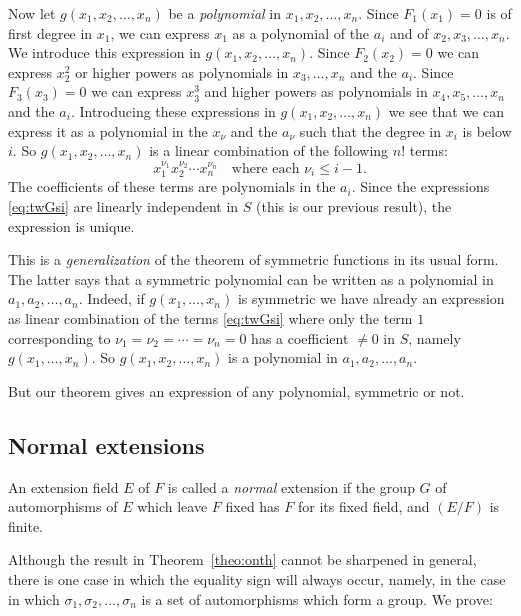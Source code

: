 \documentclass[10pt,leqno]{article}
\theoremstyle{definition}
\begin{document}
Now let $g(x_1, x_2, \ldots, x_n)$ be a \emph{polynomial} in $x_1, x_2, \ldots, x_n$.
Since $F_1(x_1) = 0$ is of first degree in $x_1$, we can express $x_1$ as a polynomial of the $a_i$ and of $x_2, x_3, \ldots, x_n$.
We introduce this expression in $g(x_1,x_2,\ldots,x_n)$.
Since $F_2(x_2) = 0$ we can express $x_2^2$ or higher powers as polynomials in $x_3, \ldots, x_n$ and the $a_i$.
Since $F_3(x_3) = 0$ we can express $x_3^3$ and higher powers as polynomials in $x_4, x_5, \ldots, x_n$ and the $a_i$.
Introducing these expressions in $g(x_1, x_2, \ldots, x_n)$ we see that we can express it as a polynomial in the $x_\nu$ and the $a_\nu$ such that the degree in $x_i$ is below $i$.
So $g(x_1, x_2, \ldots, x_n)$ is a linear combination of the following $n!$ terms:
\begin{equation}
\label{eq:twGsi}
x_1^{\nu_1} x_2^{\nu_2} \cdots x_n^{\nu_n}
\quad
\text{where each $\nu_i \leq i-1$.}
\end{equation}
The coefficients of these terms are polynomials in the $a_i$.
Since the expressions \eqref{eq:twGsi} are linearly independent in $S$ (this is our previous result), the expression is unique.

This is a \emph{generalization} of the theorem of symmetric functions in its usual form.
The latter says that a symmetric polynomial can be written as a polynomial in $a_1, a_2, \ldots, a_n$.
Indeed, if $g(x_1, \ldots, x_n)$ is symmetric we have already an expression as linear combination of the terms \eqref{eq:twGsi} where only the term $1$ corresponding to $\nu_1 = \nu_2 = \cdots = \nu_n = 0$ has a coefficient $\not= 0$ in $S$, namely $g(x_1, \ldots, x_n)$.
So $g(x_1, x_2, \ldots, x_n)$ is a polynomial in $a_1, a_2, \ldots, a_n$.

But our theorem gives an expression of any polynomial, symmetric or not.



\subsection{Normal extensions}

An extension field $E$ of $F$ is called a \emph{normal} extension if the group $G$ of automorphisms of $E$ which leave $F$ fixed has $F$ for its fixed field, and $(E/F)$ is finite.

Although the result in Theorem~\ref{theo:onth} cannot be sharpened in general, there is one case in which the equality sign will always occur, namely, in the case in which $\sigma_1, \sigma_2, \ldots, \sigma_n$ is a set of automorphisms which form a group.
We prove:
\end{document}
